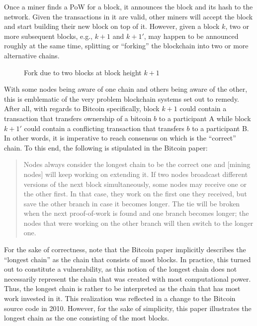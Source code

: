 Once a miner finds a PoW for a block, it announces the block and its hash to the network.
Given the transactions in it are valid, other miners will accept the block and start building their new block on top of it.
However, given a block $k$, two or more subsequent blocks, e.g., $k + 1$ and $k + 1'$, may happen to be announced roughly at the same time, splitting or ``forking'' \autocite{bitcoinwiki2015fork} the blockchain into two or more alternative chains.
\\
\begin{figure}[H]
	\centering
	
	\caption*{Fork due to two blocks at block height $k + 1$}
\end{figure}

With some nodes being aware of one chain and others being aware of the other, this is emblematic of the very problem blockchain systems set out to remedy.
After all, with regards to Bitcoin specifically, block $k + 1$ could contain a transaction that transfers ownership of a bitcoin $b$ to a participant A while block $k + 1'$ could contain a conflicting transaction that transfers $b$ to a participant B.
In other words, it is imperative to reach consensus on which is the ``correct'' chain.
To this end, the following is stipulated in the Bitcoin paper: \autocite[3]{bitcoin2008paper}

\begin{quote}
	Nodes always consider the longest chain to be the correct one and [mining nodes] will keep working on extending it.
	If two nodes broadcast different versions of the next block simultaneously, some nodes may receive one or the other first.
	In that case, they work on the first one they received, but save the other branch in case it becomes longer.
	The tie will be broken when the next proof-of-work is found and one branch becomes longer; the nodes that were working on the other branch will then switch to the longer one.
\end{quote}

For the sake of correctness, note that the Bitcoin paper implicitly describes the ``longest chain'' as the chain that consists of most blocks.
In practice, this turned out to constitute a vulnerability, as this notion of the longest chain does not necessarily represent the chain that was created with most computational power.
Thus, the longest chain is rather to be interpreted as the chain that has most work invested in it.
This realization was reflected in a change to the Bitcoin source code in 2010. \autocite{github2010bitcoinworkvsheight}
However, for the sake of simplicity, this paper illustrates the longest chain as the one consisting of the most blocks.

